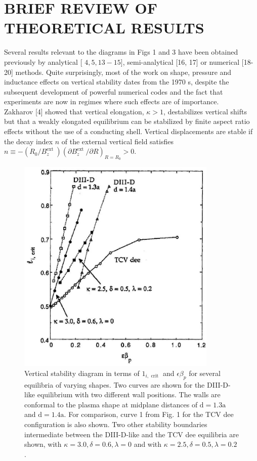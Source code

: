 \documentclass[utf8]{ctexart}
\begin{document}
\begin{sloppypar}
  
 
 \section{BRIEF REVIEW OF THEORETICAL RESULTS}
 Several results relevant to the diagrams in Figs 1 and 3 have been obtained previously by analytical [ $4,5,13-15]$, semi-analytical [16, 17] or numerical [18-20] methods. Quite surprisingly, most of the work on shape, pressure and inductance effects on vertical stability dates from the 1970 s, despite the subsequent development of powerful numerical codes and the fact that experiments are now in regimes where such effects are of importance.\\ Zakharov [4] showed that vertical elongation, $\kappa>1$, destabilizes vertical shifts but that a weakly elongated equilibrium can be stabilized by finite aspect ratio effects without the use of a conducting shell. Vertical displacements are stable if the decay index $n$ of the external vertical field satisfies $n \equiv-\left(R_{0} / B_{z}^{\text {ext }}\right)\left(\partial B_{z}^{\text {ext }} / \partial R\right)_{R=R_{0}}>0$.
 \begin{figure}[H]
 	\centering
 	\includegraphics[max width=0.85\textwidth,max height=0.3\textheight]{2025_01_10_a0135324997886412d98g-5}
 	\caption{Vertical stability diagram in terms of $1_{i, \text { crit }}$ and $\epsilon \beta_{p}$ for several equilibria of varying shapes. Two curves are shown for the DIII-D-like equilibrium with two different wall positions. The walls are conformal to the plasma shape at midplane distances of $\mathrm{d}=1.3 \mathrm{a}$ and $\mathrm{d}=1.4 \mathrm{a}$. For comparison, curve 1 from Fig. 1 for the TCV dee configuration is also shown. Two other stability boundaries intermediate between the DIII-D-like and the TCV dee equilibria are shown, with $\kappa=3.0, \delta=0.6, \lambda=0$ and with $\kappa=2.5, \delta=0.5, \lambda=0.2$.}
 	\label{fig3.}
 \end{figure}
 

\end{sloppypar}
\end{document}
